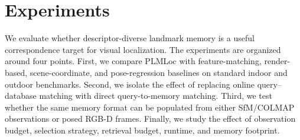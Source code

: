 \documentclass[letterpaper,10 pt,conference]{ieeeconf}
\newcommand{\method}{PLMLoc}
\begin{document}
\section{Experiments}

We evaluate whether descriptor-diverse landmark memory is a useful correspondence target for visual localization. The experiments are organized around four points. First, we compare \method{} with feature-matching, render-based, scene-coordinate, and pose-regression baselines on standard indoor and outdoor benchmarks. Second, we isolate the effect of replacing online query--database matching with direct query-to-memory matching. Third, we test whether the same memory format can be populated from either SfM/COLMAP observations or posed RGB-D frames. Finally, we study the effect of observation budget, selection strategy, retrieval budget, runtime, and memory footprint.
\end{document}
